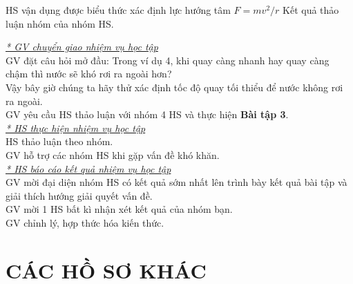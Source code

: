 {HS vận dụng được biểu thức xác định lực hướng tâm $F=mv^2/r$}
{Kết quả thảo luận nhóm của nhóm HS.
}
{\textit{\underline{* GV chuyển giao nhiệm vụ học tập}}\\
	GV đặt câu hỏi mở đầu: Trong ví dụ 4, khi quay càng nhanh hay quay càng chậm thì nước sẽ khó rơi ra ngoài hơn?\\
	Vậy bây giờ chúng ta hãy thử xác định tốc độ quay tối thiểu để nước không rơi ra ngoài.\\
	GV yêu cầu HS thảo luận với nhóm 4 HS và thực hiện \textbf{Bài tập 3}.\\
	\textit{\underline{* HS thực hiện nhiệm vụ học tập}}\\
	HS thảo luận theo nhóm.\\
	GV hỗ trợ các nhóm HS khi gặp vấn đề khó khăn.\\
	\textit{\underline{* HS báo cáo kết quả nhiệm vụ học tập}}\\
	GV mời đại diện nhóm HS có kết quả sớm nhất lên trình bày kết quả bài tập và giải thích hướng giải quyết vấn đề.\\
	GV mời 1 HS bất kì nhận xét kết quả của nhóm bạn.\\
	GV chỉnh lý, hợp thức hóa kiến thức.

}
\section{CÁC HỒ SƠ KHÁC}
